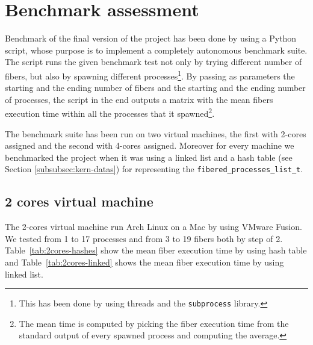 \documentclass[a4paper,10pt]{article}
\begin{document}
\section{Benchmark assessment}
Benchmark of the final version of the project has been done by using a Python script, whose purpose is to implement a completely autonomous benchmark suite. The script runs the given benchmark test not only by trying different number of fibers, but also by spawning different processes\footnote{This has been done by using threads and the \lstinline{subprocess} library.}. By passing as parameters the starting and the ending number of fibers and the starting and the ending number of processes, the script in the end outputs a matrix with the mean fibers execution time within all the processes that it spawned\footnote{The mean time is computed by picking the fiber execution time from the standard output of every spawned process and computing the average.}.

The benchmark suite has been run on two virtual machines, the first with 2-cores assigned and the second with 4-cores assigned. Moreover for every machine we benchmarked the project when it was using a linked list and a hash table (see Section \ref{subsubsec:kern-datas}) for representing the \lstinline{fibered_processes_list_t}.

\subsection{2 cores virtual machine}
The 2-cores virtual machine run Arch Linux on a Mac by using VMware Fusion. We tested from 1 to 17 processes and from 3 to 19 fibers both by step of 2. Table~\ref{tab:2cores-hashes} show the mean fiber execution time by using hash table and Table~\ref{tab:2cores-linked} shows the mean fiber execution time by using linked list.
\end{document}
